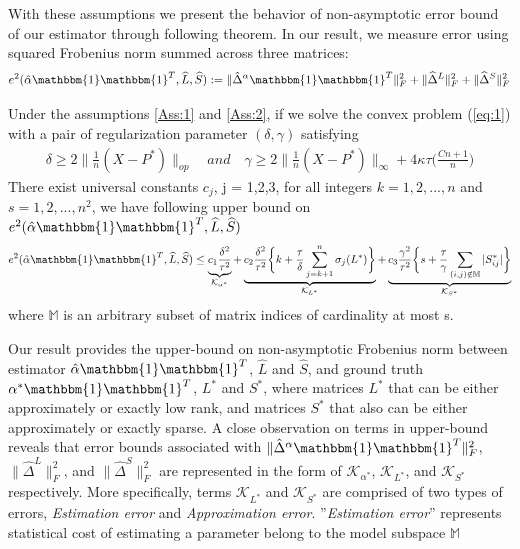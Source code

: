 \documentclass[AMS,STIX1COL]{WileyNJD-v2}
\begin{document}
With these assumptions we present the behavior of non-asymptotic error bound of our estimator through following theorem. In our result, we measure error using squared Frobenius norm summed across three matrices:
\[
    e^{2}(\hat{\alpha}\mathbbm{1}\mathbbm{1}^T,\widehat{L},\widehat{S}):=\|\hat{\Delta}^{\alpha}\mathbbm{1}\mathbbm{1}^T\|_{F}^{2} + \|\widehat{\Delta}^{L}\|_{F}^{2} + \|\widehat{\Delta}^{S}\|_{F}^{2}
\]

\begin{theorem} \label{Th:th1}
Under the assumptions \ref{Ass:1} and \ref{Ass:2},
if we solve the convex problem (\ref{eq:1}) with a pair of regularization parameter $(\delta,\gamma)$ satisfying 
\begin{align}
\delta \geq 2\|\frac{1}{n}(X-P^{*})\|_{op} \quad and \quad \gamma \geq 2\|\frac{1}{n}(X-P^{*})\|_{\infty}+4\kappa\tau\bigg(\frac{Cn+1}{n} \bigg)
\end{align}
There exist universal constants $c_{j}$, j = 1,2,3,  for all integers $k = 1,2,...,n$ and $s = 1,2,...,n^{2}$, we have following upper bound on $e^{2}(\hat{\alpha}\mathbbm{1}\mathbbm{1}^T,\widehat{L},\widehat{S})$
\begin{align}
    e^{2}(\hat{\alpha}\mathbbm{1}\mathbbm{1}^T,\widehat{L},\widehat{S}) \leq
    \underbrace{c_{1}\frac{\delta^{2}}{\tau^{2}}}
    _{\mathcal{K}_{\alpha^*}} +
    \underbrace{c_{2}\frac{\delta^{2}}{\tau^{2}}
    \bigg\{k + \frac{\tau}{\delta}\sum_{j=k+1}^{n}\sigma_{j}(L^{*})\bigg\}}_{\mathcal{K}_{L^*}} +
    \underbrace{c_{3}\frac{\gamma^{2}}{\tau^{2}}
    \bigg\{s + \frac{\tau}{\gamma}\sum_{(i,j) \notin \mathbb{M}}|S^*_{ij}|\bigg\}}_{\mathcal{K}_{S^*}}
\end{align}
where $\mathbb{M}$ is an arbitrary subset of matrix indices of cardinality at most s.
\end{theorem}

Our result provides the upper-bound on non-asymptotic Frobenius norm between estimator $\hat{\alpha}\mathbbm{1}\mathbbm{1}^T$, $\widehat{L}$ and $\widehat{S}$, and ground truth $\alpha^*\mathbbm{1}\mathbbm{1}^T$, $L^*$ and $S^*$, where matrices $L^*$ that can be either approximately or exactly low rank, and matrices $S^*$ that also can be either approximately or exactly sparse. 
A close observation on terms in upper-bound reveals that error bounds associated with $\|\hat{\Delta}^{\alpha}\mathbbm{1}\mathbbm{1}^T\|_{F}^{2}$, $\|\widehat{\Delta}^{L}\|_{F}^{2}$, and $\|\widehat{\Delta}^{S}\|_{F}^{2}$ are represented in the form of $\mathcal{K}_{\alpha^*}$, $\mathcal{K}_{L^*}$, and $\mathcal{K}_{S^*}$ respectively.
More specifically, terms $\mathcal{K}_{L^*}$ and $\mathcal{K}_{S^*}$ are comprised of two types of errors, \emph{Estimation error} and \emph{Approximation error}. ''\emph{Estimation error}'' represents statistical cost of estimating a parameter belong to the model subspace $\mathbb{M}$  
\end{document}
